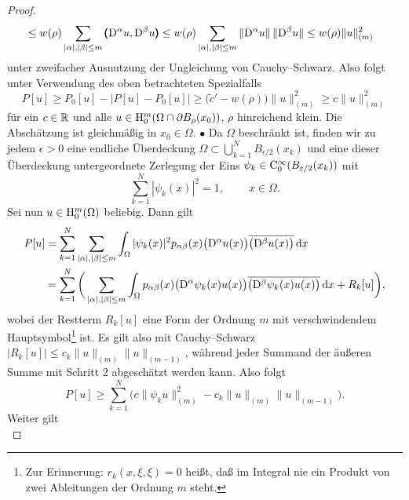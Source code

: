 \begin{proof}
\begin{equation}
\begin{split}
	&\le w(\rho) \sum\limits_{|\alpha|,|\beta| \le m} \pmb(\mathrm D^\alpha u,\mathrm D^\beta u\pmb) \le  w(\rho) \sum\limits_{|\alpha|,|\beta| \le m}\|\mathrm D^\alpha u\|\, \|\mathrm D^\beta u\| \le
	 w(\rho) \|u\|_{(m)}^2
\end{split}
\end{equation}
unter zweifacher Ausnutzung der Ungleichung von Cauchy--Schwarz. Also folgt unter Verwendung des oben betrachteten Spezialfalls
\begin{equation}
	P[u] \ge P_0[u] - \big| P[u] - P_0[u] \big| \ge \big( \tilde c' - w(\rho) \big) \|u\|_{(m)}^2 \ge  c \| u\|_{(m)}^2
\end{equation} 
für ein $c\in\mathbb R$ und alle $u\in \mathrm H_0^m(\Omega \cap \partial B_\rho(x_0))$,  $\rho$ hinreichend klein. Die Abschätzung ist gleichmäßig in $x_0\in\Omega$.
$\bullet$ Da $\Omega$ beschränkt ist, finden wir zu jedem $\epsilon>0$ eine endliche Überdeckung $\Omega\subset\bigcup_{k=1}^N B_{{\epsilon}/{2}}(x_k)$ und eine dieser Überdeckung untergeordnete Zerlegung der Eins $\psi_k\in\mathrm C_0^\infty(B_{\varepsilon/2}(x_k))$ mit
\begin{equation}
 \sum\limits_{k=1}^N |\psi_k(x)|^2 = 1,\qquad \ x\in \Omega.
\end{equation}
Sei nun $u\in\mathrm H_0^m(\Omega)$ beliebig. Dann gilt
\begin{equation}
\begin{split}
	P[u]&= \sum_{k=1}^N \sum\limits_{|\alpha|,|\beta|\le m} \int_\Omega |\psi_k(x)|^2p_{\alpha\beta}(x)\big(\mathrm D^\alpha u(x)\big)\overline{\big(\mathrm D^\beta u(x)\big)}\,\mathrm d x\\
	&=  \sum_{k=1}^N \bigg( \sum\limits_{|\alpha|,|\beta|\le m} \int_\Omega  p_{\alpha\beta}(x)\big(\mathrm D^\alpha \psi_k(x) u(x)\big)\overline{\big(\mathrm D^\beta \psi_k(x) u(x)\big)}\,\mathrm d x + R_k[u]\bigg),
\end{split}
\end{equation}
wobei der Restterm $R_k[u]$ eine Form der Ordnung $m$ mit verschwindendem Hauptsymbol\footnote{Zur Erinnerung: $r_k(x,\xi,\xi)=0$ heißt, daß im Integral nie ein Produkt von zwei Ableitungen der Ordnung $m$ steht.} ist. Es gilt also mit Cauchy--Schwarz $|R_k[u]|\le c_k \|u\|_{(m)} \|u\|_{(m-1)}$, während jeder Summand der äußeren Summe mit Schritt 2 abgeschätzt werden kann. Also folgt 
\begin{equation}\label{eq:6.16}
P[u] \ge \sum_{k=1}^N  \bigg( c \|\psi_k u\|_{(m)}^2 - c_k \|u\|_{(m)} \|u\|_{(m-1)} \bigg) .
\end{equation}
Weiter gilt 
\begin{equation}

\end{equation}
\end{proof}
